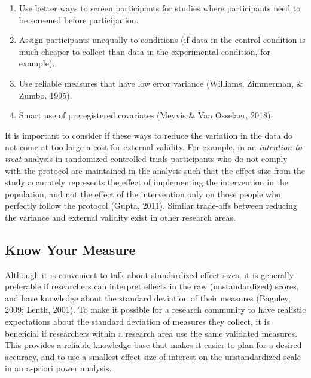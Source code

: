\documentclass[
  english,
  ,jou, a4paper,floatsintext]{apa6}
\providecommand{\tightlist}{%
  \setlength{\itemsep}{0pt}\setlength{\parskip}{0pt}}
\begin{document}
\begin{enumerate}
\def\labelenumi{\arabic{enumi}.}
\tightlist
\item
  Use better ways to screen participants for studies where participants need to be screened before participation.
\item
  Assign participants unequally to conditions (if data in the control condition is much cheaper to collect than data in the experimental condition, for example).
\item
  Use reliable measures that have low error variance (Williams, Zimmerman, \& Zumbo, 1995).
\item
  Smart use of preregistered covariates (Meyvis \& Van Osselaer, 2018).
\end{enumerate}

It is important to consider if these ways to reduce the variation in the data do not come at too large a cost for external validity. For example, in an \emph{intention-to-treat} analysis in randomized controlled trials participants who do not comply with the protocol are maintained in the analysis such that the effect size from the study accurately represents the effect of implementing the intervention in the population, and not the effect of the intervention only on those people who perfectly follow the protocol (Gupta, 2011). Similar trade-offs between reducing the variance and external validity exist in other research areas.

\hypertarget{know-your-measure}{%
\subsection{Know Your Measure}\label{know-your-measure}}

Although it is convenient to talk about standardized effect sizes, it is generally preferable if researchers can interpret effects in the raw (unstandardized) scores, and have knowledge about the standard deviation of their measures (Baguley, 2009; Lenth, 2001). To make it possible for a research community to have realistic expectations about the standard deviation of measures they collect, it is beneficial if researchers within a research area use the same validated measures. This provides a reliable knowledge base that makes it easier to plan for a desired accuracy, and to use a smallest effect size of interest on the unstandardized scale in an a-priori power analysis.
\end{document}
